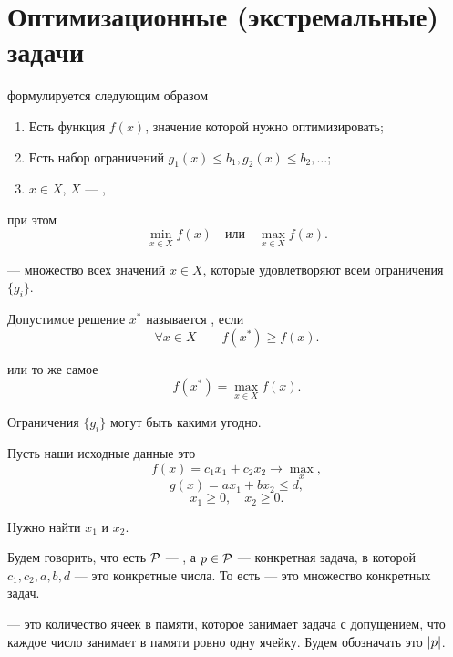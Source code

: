 \section{Оптимизационные (экстремальные) задачи}


 формулируется следующим образом

\begin{enumerate}[nosep]
	\item Есть функция $f(x)$, значение которой нужно оптимизировать;
	
	\item Есть набор ограничений $g_1(x) \le b_1, g_2(x) \le b_2, \dots$;
	
	\item $x \in X$, $X$ --- ,
\end{enumerate}

при этом 
\[
	\min_{x \in X} f(x) \quad \text{или} \quad \max_{x \in X} f(x).
\]


 --- множество всех значений $x \in X$, которые удовлетворяют всем ограничения $\{g_i\}$.


Допустимое решение $x^*$ называется , если
\[
	\forall x \in X \qquad f(x^*) \ge f(x).	
\]

или то же самое
\[
	f(x^*) = \max_{x \in X} f(x).	
\]

\remark

Ограничения $\{g_i\}$ могут быть какими угодно.

\example

Пусть наши исходные данные это
\[f(x) = c_1 x_1 + c_2 x_2 \to \max_x,\]
\[g(x) = ax_1 + bx_2 \le d,\]
\[x_1 \ge 0, \quad x_2 \ge 0.\]

Нужно найти $x_1$ и $x_2$.


Будем говорить, что есть $\P$ --- , а $p \in \P$ --- конкретная задача, в которой $c_1, c_2, a, b, d$ --- это конкретные числа. То есть  --- это множество конкретных задач.


 --- это количество ячеек в памяти, которое занимает задача с допущением, что каждое число занимает в памяти ровно одну ячейку. Будем обозначать это $\abs{p}$.

